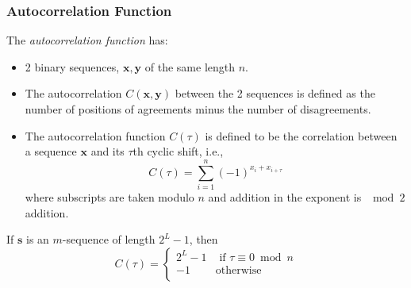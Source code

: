 \subsubsection{Autocorrelation Function}\label{subsubsec:Autocorrelation_Function}
\begin{definition}\label{def:LFSR_Autocorrelation_Function}
  The \emph{autocorrelation function} has:
  \begin{itemize}[noitemsep]
  \item 2 binary sequences, $\mathbf{x}, \mathbf{y}$ of the same length $n$.
  \item The autocorrelation $C(\mathbf{x}, \mathbf{y})$ between the 2 sequences is defined as the number of positions of agreements minus the number of disagreements.
  \item The autocorrelation function $C(\tau)$ is defined to be the correlation between a sequence $\mathbf{x}$ and its $\tau$th cyclic shift, i.e.,
    \begin{equation}\label{eq:LFSR_Autocorrelation_Function}
      C(\tau) = \sum\limits_{i=1}^{n} {(-1)}^{x_{i}+x_{i+\tau}}
    \end{equation}
    where subscripts are taken modulo $n$ and addition in the exponent is $\mod{2}$ addition.
  \end{itemize}
\end{definition}

\begin{theorem}\label{thm:M_Sequence_Autocorrelation}
  If $\mathbf{s}$ is an $m$-sequence of length $2^{L}-1$, then
  \begin{equation}\label{eq:M_Sequence_Autocorrelation}
    C(\tau) =
    \begin{cases}
      2^{L} - 1 & \text{ if } \tau \equiv 0 \bmod n \\
      -1 & \text{otherwise} \\
    \end{cases}
  \end{equation}
\end{theorem}
